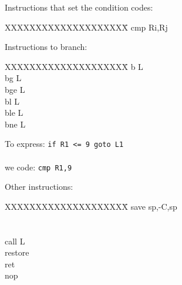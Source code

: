 \begin{slide*}
Instructions that set the condition codes:\\

\begin{tt}
\begin{tabbing}
XXXXXXXXXXXXXXXXXXXX\=\kill
cmp    Ri,Rj\\
\end{tabbing}
\end{tt}

Instructions to branch:\\

\begin{tt}
\begin{tabbing}
XXXXXXXXXXXXXXXXXXXX\=\kill
b    L\\
bg   L\\
bge  L\\
bl   L\\
ble  L\\
bne  L\\
\end{tabbing}
\end{tt}

\begin{tabbing}
To express: \={\tt if R1 <= 9 goto L1}\\
\\
we code:\> {\tt cmp R1,9}\\
\end{tabbing}
\vfil
\end{slide*}

\begin{slide*}
Other instructions:\\

\begin{tt}
\begin{tabbing}
XXXXXXXXXXXXXXXXXXXX\=\kill
save sp,-C,sp\\
             \\
             \\
call L       \\
restore      \\
ret          \\
nop          \\
\end{tabbing}
\end{tt}
\vfil
\end{slide*}

